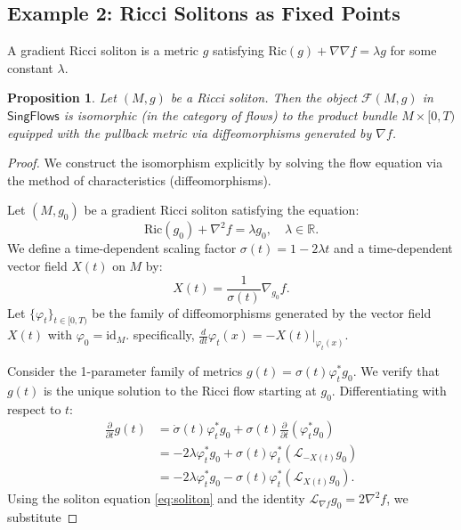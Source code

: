 \documentclass[11pt]{article}
\newtheorem{proposition}[theorem]{Proposition}
\newcommand{\SingFlows}{\mathsf{SingFlows}}
\begin{document}
\subsection*{Example 2: Ricci Solitons as Fixed Points}
A gradient Ricci soliton is a metric $g$ satisfying $\mathrm{Ric}(g) + \nabla \nabla f = \lambda g$ for some constant $\lambda$.

\begin{proposition}
Let $(M, g)$ be a Ricci soliton. Then the object $\mathcal{F}(M, g)$ in $\SingFlows$ is isomorphic (in the category of flows) to the product bundle $M \times [0, T)$ equipped with the pullback metric via diffeomorphisms generated by $\nabla f$.
\end{proposition}

\begin{proof}
We construct the isomorphism explicitly by solving the flow equation via the method of characteristics (diffeomorphisms).

Let $(M, g_0)$ be a gradient Ricci soliton satisfying the equation:
\begin{equation} \label{eq:soliton}
\mathrm{Ric}(g_0) + \nabla^2 f = \lambda g_0, \quad \lambda \in \mathbb{R}.
\end{equation}
We define a time-dependent scaling factor $\sigma(t) = 1 - 2\lambda t$ and a time-dependent vector field $X(t)$ on $M$ by:
\[ X(t) = \frac{1}{\sigma(t)} \nabla_{g_0} f. \]
Let $\{\varphi_t\}_{t \in [0, T)}$ be the family of diffeomorphisms generated by the vector field $X(t)$ with $\varphi_0 = \mathrm{id}_M$. specifically, $\frac{d}{dt}\varphi_t(x) = -X(t)|_{\varphi_t(x)}$.

Consider the 1-parameter family of metrics $g(t) = \sigma(t) \varphi_t^* g_0$. We verify that $g(t)$ is the unique solution to the Ricci flow starting at $g_0$.
Differentiating with respect to $t$:
\begin{align*}
\frac{\partial}{\partial t} g(t) &= \dot{\sigma}(t) \varphi_t^* g_0 + \sigma(t) \frac{\partial}{\partial t} (\varphi_t^* g_0) \\
&= -2\lambda \varphi_t^* g_0 + \sigma(t) \varphi_t^* (\mathcal{L}_{-X(t)} g_0) \\
&= -2\lambda \varphi_t^* g_0 - \sigma(t) \varphi_t^* (\mathcal{L}_{X(t)} g_0).
\end{align*}
Using the soliton equation \eqref{eq:soliton} and the identity $\mathcal{L}_{\nabla f} g_0 = 2\nabla^2 f$, we substitute 


\end{proof}
\end{document}
